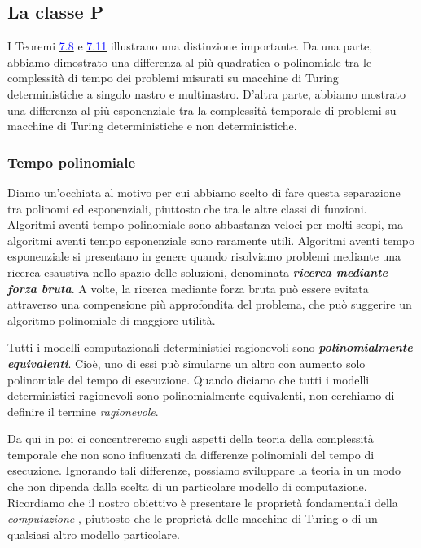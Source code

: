 \documentclass{article}
\begin{document}
\subsection{La classe P}
I Teoremi \hyperref[teorema-7.8]{\textcolor{blue}{7.8}} e \hyperref[teorema-7.11]{\textcolor{blue}{7.11}} illustrano una distinzione importante.
Da una parte, abbiamo dimostrato una differenza al più quadratica o polinomiale tra le complessità di tempo dei problemi misurati su macchine di Turing deterministiche a singolo nastro e multinastro.
D'altra parte, abbiamo mostrato una differenza al più esponenziale tra la complessità temporale di problemi su macchine di Turing deterministiche e non deterministiche.

\subsubsection{Tempo polinomiale}
Diamo un'occhiata al motivo per cui abbiamo scelto di fare questa separazione tra polinomi ed esponenziali, piuttosto che tra le altre classi di funzioni.
\newline
Algoritmi aventi tempo polinomiale sono abbastanza veloci per molti scopi, ma algoritmi aventi tempo esponenziale sono raramente utili.
Algoritmi aventi tempo esponenziale si presentano in genere quando risolviamo problemi mediante una ricerca esaustiva nello spazio delle soluzioni, denominata \textit{\textbf{ricerca mediante forza bruta}}.
A volte, la ricerca mediante forza bruta può essere evitata attraverso una compensione più approfondita del problema, che può suggerire un algoritmo polinomiale di maggiore utilità.

Tutti i modelli computazionali deterministici ragionevoli sono \textit{\textbf{polinomialmente equivalenti}}.
Cioè, uno di essi può simularne un altro con aumento solo polinomiale del tempo di esecuzione.
Quando diciamo che tutti i modelli deterministici ragionevoli sono polinomialmente equivalenti, non cerchiamo di definire il termine \textit{ragionevole}.

Da qui in poi ci concentreremo sugli aspetti della teoria della complessità temporale che non sono influenzati da differenze polinomiali del tempo di esecuzione.
Ignorando tali differenze, possiamo sviluppare la teoria in un modo che non dipenda dalla scelta di un particolare modello di computazione.
Ricordiamo che il nostro obiettivo è presentare le proprietà fondamentali della \textit{computazione} , piuttosto che le proprietà delle macchine di Turing o di un qualsiasi altro modello particolare.
\end{document}
